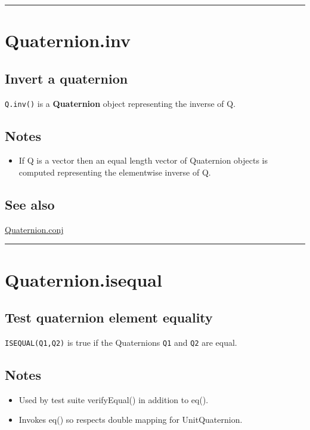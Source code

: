 \vspace{1.5ex}\hrule

\hypertarget{Quaternion.inv}{\section*{Quaternion.inv}}
\subsection*{Invert a quaternion}


\texttt{Q.inv()} is a \textbf{\color{red} Quaternion} object representing the inverse of Q.


\subsection*{Notes}
\begin{itemize}
  \item If Q is a vector then an equal length vector of Quaternion objects    is computed representing the elementwise inverse of Q.
\end{itemize}

\subsection*{See also}


\hyperlink{Quaternion.conj}{\color{blue} Quaternion.conj}

\vspace{1.5ex}\hrule

\hypertarget{Quaternion.isequal}{\section*{Quaternion.isequal}}
\subsection*{Test quaternion element equality}


\texttt{ISEQUAL(Q1,Q2)} is true if the Quaternions \texttt{Q1} and \texttt{Q2} are equal.


\subsection*{Notes}
\begin{itemize}
  \item Used by test suite verifyEqual() in addition to eq().
  \item Invokes eq() so respects double mapping for UnitQuaternion.
\end{itemize}

